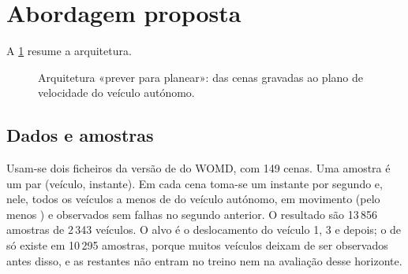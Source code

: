 \section{Abordagem proposta}
\label{sec:abordagem}

A \cref{fig:arquitetura} resume a arquitetura.

\begin{figure}[t]
\centering
{}
\caption{Arquitetura «prever para planear»: das cenas gravadas ao plano de
  velocidade do veículo autónomo.}
\label{fig:arquitetura}
\end{figure}

\subsection{Dados e amostras}

Usam-se dois ficheiros da versão de  do WOMD, com 149 cenas.
Uma amostra é um par (veículo, instante). Em cada cena toma-se um
instante por segundo e, nele, todos os veículos a menos de  do
veículo autónomo, em movimento (pelo menos ) e observados sem
falhas no segundo anterior. O resultado são 13\,856 amostras de 2\,343
veículos. O alvo é o deslocamento do veículo 1, 3 e  depois; o
de  só existe em 10\,295 amostras, porque muitos veículos deixam
de ser observados antes disso, e as restantes não entram no treino nem na
avaliação desse horizonte.

